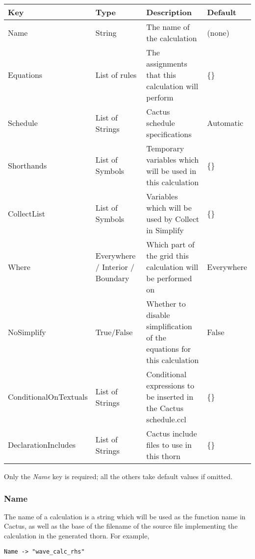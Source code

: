 \documentclass{report}
\newcommand{\tablewidth}{\textwidth}
\begin{document}
\begin{center}
\begin{tabularx}{\tablewidth}{|l|X|X|l|}
  \hline
  \bf Key & \bf Type & \bf Description & \bf Default\\
  \hline
  Name & String & The name of the calculation & (none) \\

  Equations & List of rules & The assignments that this calculation will perform & \{\} \\
  Schedule & List of Strings & Cactus schedule specifications & Automatic \\
  Shorthands & List of Symbols & Temporary variables which will be used in this calculation & \{\} \\
  CollectList & List of Symbols & Variables which will be used by Collect in Simplify & \{\} \\
  Where &  Everywhere / Interior / Boundary & Which part of the grid this calculation will be performed on & Everywhere \\
  NoSimplify & True/False & Whether to disable simplification of the equations for this calculation & False \\
  ConditionalOnTextuals & List of Strings & Conditional expressions to be inserted in the Cactus schedule.ccl & \{\} \\
  DeclarationIncludes & List of Strings & Cactus include files to use in this thorn & \{\} \\
  \hline
\end{tabularx}
\end{center}

Only the {\it Name} key is required; all the others take default
values if omitted.

\subsubsection{Name}

The name of a calculation is a string which will be used as the
function name in Cactus, as well as the base of the filename of the
source file implementing the calculation in the generated thorn.  For
example,

\begin{center}
\begin{minipage}{0.8 \textwidth}
\begin{verbatim}
Name -> "wave_calc_rhs"
\end{verbatim}
\end{minipage}
\end{center}
\end{document}
